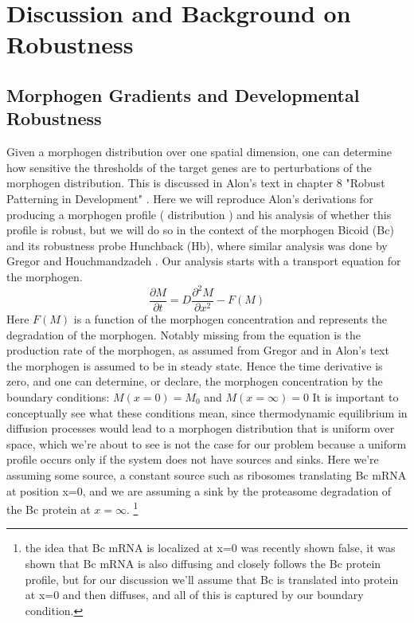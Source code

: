 \section{Discussion and Background on Robustness}
\subsection{Morphogen Gradients and Developmental Robustness}

Given a morphogen distribution over one spatial dimension, one can determine how sensitive the thresholds of the target genes are to perturbations of the morphogen distribution.  This is discussed in Alon's text in chapter 8 "Robust Patterning in Development" \cite{designp}.  Here we will reproduce Alon's derivations for producing a morphogen profile ( distribution ) and his analysis of whether this profile is robust, but we will do so in the context of the morphogen Bicoid (Bc) and its robustness probe Hunchback (Hb), where similar analysis was done by Gregor and Houchmandzadeh \cite{pmid17632062}\cite{pmid11845210}.  Our analysis starts with a transport equation for the morphogen.
\begin{equation}\label{}
    \frac{\partial M}{\partial t} =  D \frac{\partial^2 M }{\partial x^2} - F(M)
\end{equation}
Here $F(M)$ is a function of the morphogen concentration and represents the degradation of the morphogen.  Notably missing from the equation is the production rate of the morphogen, as assumed from Gregor and in Alon's text the morphogen is assumed to be in steady state\cite{designp}.  Hence the time derivative is zero, and one can determine, or declare, the morphogen concentration by the boundary conditions:
$
    M(x = 0) = M_0 $ and $  M(x=\infty) = 0
$
 It is important to conceptually see what these conditions mean, since thermodynamic equilibrium in diffusion processes would lead to a morphogen distribution that is uniform over space, which we're about to see is not the case for our problem because a uniform profile occurs only if the system does not have sources and sinks.  Here we're assuming some source, a constant source such as ribosomes translating Bc mRNA at position x=0, and we are assuming a sink by the proteasome degradation of the Bc protein at $x=\infty$. \footnote[1]{ the idea that Bc mRNA is localized at x=0 was recently shown false, it was shown that Bc mRNA is also diffusing and closely follows the Bc protein profile, but for our discussion we'll assume that Bc is translated into protein at x=0 and then diffuses, and all of this is captured by our boundary condition.}
